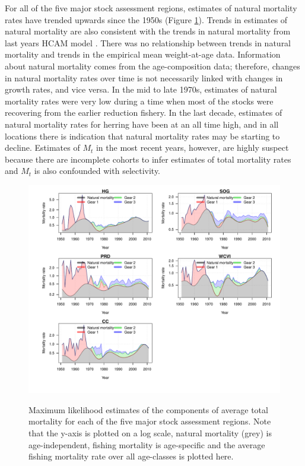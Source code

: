 For all of the five major stock assessment regions, estimates of natural mortality rates have trended upwards since the 1950s (Figure \ref{PartII:Results:figMortality}).  Trends in estimates of natural mortality are also consistent with the trends in natural mortality from last years HCAM model  \citep[see Figure 18 in][]{Clear2010}.  There was no relationship between trends in natural mortality and trends in the empirical mean weight-at-age data.  Information about natural mortality comes from the age-composition data; therefore, changes in natural mortality rates over time is not necessarily linked with changes in growth rates, and vice versa.   In the mid to late 1970s, estimates of natural mortality rates were very low during a time when most of the stocks were recovering from the earlier reduction fishery.  In the last decade, estimates of natural mortality rates for herring have been at an all time high, and in all locations there is indication that natural mortality rates may be starting to decline. Estimates of $M_t$ in the most recent years, however,  are highly suspect because there are incomplete cohorts to infer estimates of total mortality rates and $M_t$ is also confounded with selectivity.



\begin{figure}[!tbp]
	\includegraphics[width=\textwidth]{../FIGS/qPriorFigs/iscam_fig_mortality.pdf}\\
	\caption{Maximum likelihood estimates of the components of average total mortality for each of the five major stock assessment regions. Note that the y-axis is plotted on a log scale, natural mortality (grey) is age-independent, fishing mortality is age-specific and the average fishing mortality rate over all age-classes is plotted here.}\label{PartII:Results:figMortality}
\end{figure}

